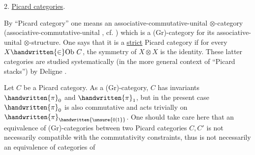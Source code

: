 2. \uline{Picard categories}.

By ``Picard category'' one means an associative-commutative-unital $\otimes$-category (associative-commutative-unital , cf. \handwritten{[\, ]}) which is a (Gr)-category for its  associative-unital $\otimes$-structure. One says that it is a \uline{strict} Picard category if for every $X\handwritten{\in}\mathrm{Ob}\ C$, the symmetry of $X\otimes X$ is the identity. These  latter categories are studied systematically (in the more general context of ``Picard stacks'') by Deligne \handwritten{[\, ]}.

Let $C$ be a Picard category. As a (Gr)-category, $C$ has invariants $\handwritten{\pi}_{0}$ and $\handwritten{\pi}_{1}$, but in the present case $\handwritten{\pi}_{0}$ is also commutative and acts trivially on $\handwritten{\pi}_{\handwritten{\unsure{0|1}}}$. One should take care here that an equivalence of (Gr)-categories between two Picard categories $C,C'$ is not necessarily compatible with the commutativity constraints, thus is not necessarily an equivalence of categories of
